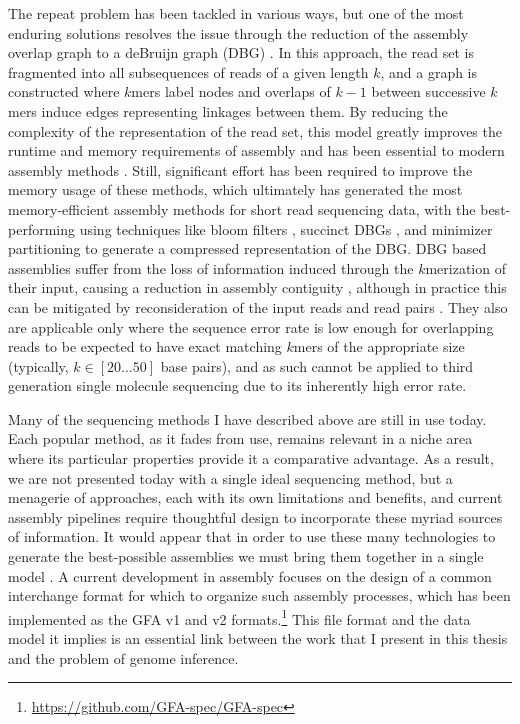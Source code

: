 The repeat problem has been tackled in various ways, but one of the most enduring solutions resolves the issue through the reduction of the assembly overlap graph to a deBruijn graph (DBG) \cite{pevzner2001eulerian}.
In this approach, the read set is fragmented into all subsequences of reads of a given length $k$, and a graph is constructed where $k$mers label nodes and overlaps of $k-1$ between successive $k$mers induce edges representing linkages between them.
By reducing the complexity of the representation of the read set, this model greatly improves the runtime and memory requirements of assembly and has been essential to modern assembly methods \cite{zerbino2008velvet,simpson2009abyss,iqbal2012novo}.
Still, significant effort has been required to improve the memory usage of these methods, which ultimately has generated the most memory-efficient assembly methods for short read sequencing data, with the best-performing using techniques like bloom filters \cite{chikhi2012space}, succinct DBGs \cite{bowe2012succinct,li2015megahit}, and minimizer partitioning \cite{chikhi2016compacting} to generate a compressed representation of the DBG.
DBG based assemblies suffer from the loss of information induced through the $k$merization of their input, causing a reduction in assembly contiguity \cite{earl2011assemblathon}, although in practice this can be mitigated by reconsideration of the input reads and read pairs \cite{butler2008allpaths}.
They also are applicable only where the sequence error rate is low enough for overlapping reads to be expected to have exact matching $k$mers of the appropriate size (typically, $k \in [20 \ldots 50]$ base pairs), and as such cannot be applied to third generation single molecule sequencing due to its inherently high error rate.

Many of the sequencing methods I have described above are still in use today.
Each popular method, as it fades from use, remains relevant in a niche area where its particular properties provide it a comparative advantage.
As a result, we are not presented today with a single ideal sequencing method, but a menagerie of approaches, each with its own limitations and benefits, and current assembly pipelines require thoughtful design to incorporate these myriad sources of information.
It would appear that in order to use these many technologies to generate the best-possible assemblies we must bring them together in a single model \cite{chaisson2018multi}.
A current development in assembly focuses on the design of a common interchange format for which to organize such assembly processes, which has been implemented as the GFA v1 and v2 formats.\footnote{\url{https://github.com/GFA-spec/GFA-spec}}
This file format and the data model it implies is an essential link between the work that I present in this thesis and the problem of genome inference.

